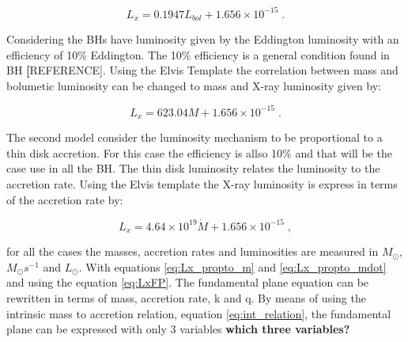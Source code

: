\begin{equation}
L_{x}=0.1947L_{bol}+1.656\times10^{-15}\;.
\end{equation}

Considering the BHs have luminosity given by the Eddington luminosity with an efficiency of 10\% Eddington.  The 10\% efficiency is a general condition found in BH \textbf[{REFERENCE]}.  Using the Elvis Template the correlation between mass and bolumetic luminosity can be changed to mass and X-ray luminosity given by:

\begin{equation}
L_{x}=623.04M+1.656\times10^{-15}\;.\label{eq:Lx_propto_m}
\end{equation}

The second model consider the luminosity mechanism to be proportional
to a thin disk accretion. For this case the efficiency is allso  10\% and that will be the case use in all the BH.  The thin disk luminosity relates the luminosity to the accretion rate.  Using the Elvis template the X-ray luminosity is express in terms of the accretion rate by:

\begin{equation}
L_{x}=4.64\times10^{19}\dot{M}+1.656\times10^{-15}\;,\label{eq:Lx_propto_mdot}
\end{equation}

for all the cases the masses, accretion rates and luminosities are
measured in $M_{\odot}$, $M_{\odot}s^{-1}$ and $L_{\odot}$. With
equations \ref{eq:Lx_propto_m} and \ref{eq:Lx_propto_mdot} and using
the equation \ref{eq:LxFP}. The fundamental plane equation can be
rewritten in terms of mass, accretion rate, k and q. By means of using
the intrinsic mass to accretion relation, equation \ref{eq:int_relation},
the fundamental plane can be expressed with only 3 variables \textbf{which 
three variables?}


